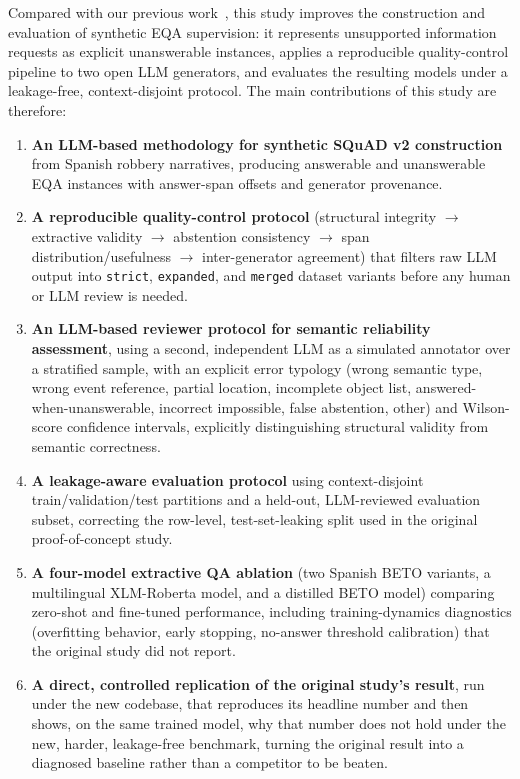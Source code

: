 \documentclass[graybox]{SNmult}
\begin{document}
Compared with our previous work~\cite{falconi2026robberyqa}, this study
improves the construction and evaluation of synthetic EQA supervision: it
represents unsupported information requests as explicit unanswerable
instances, applies a reproducible quality-control pipeline to two open LLM
generators, and evaluates the resulting models under a leakage-free,
context-disjoint protocol. The main contributions of this study are therefore:
\begin{enumerate}
\item \textbf{An LLM-based methodology for synthetic SQuAD v2
    construction} from Spanish robbery narratives, producing
  answerable and unanswerable EQA instances with answer-span offsets
  and generator provenance.
\item \textbf{A reproducible quality-control protocol} (structural
  integrity $\rightarrow$ extractive validity $\rightarrow$ abstention
  consistency $\rightarrow$ span distribution/usefulness $\rightarrow$
  inter-generator agreement) that filters raw LLM output into
  \texttt{strict}, \texttt{expanded}, and \texttt{merged} dataset
  variants before any human or LLM review is needed.
\item \textbf{An LLM-based reviewer protocol for semantic reliability
    assessment}, using a second, independent LLM as a simulated
  annotator over a stratified sample, with an explicit error typology
  (wrong semantic type, wrong event reference, partial location,
  incomplete object list, answered-when-unanswerable, incorrect
  impossible, false abstention, other) and Wilson-score confidence
  intervals, explicitly distinguishing structural validity from
  semantic correctness.
\item \textbf{A leakage-aware evaluation protocol} using
  context-disjoint train/validation/test partitions and a held-out,
  LLM-reviewed evaluation subset, correcting the row-level,
  test-set-leaking split used in the original proof-of-concept study.
\item \textbf{A four-model extractive QA ablation} (two Spanish BETO
  variants, a multilingual XLM-Roberta model, and a distilled BETO
  model) comparing zero-shot and fine-tuned performance, including
  training-dynamics diagnostics (overfitting behavior, early stopping,
  no-answer threshold calibration) that the original study did not
  report.
\item \textbf{A direct, controlled replication of the original study's
    result}, run under the new codebase, that reproduces its headline
  number and then shows, on the same trained model, why that number
  does not hold under the new, harder, leakage-free
  benchmark, turning the original result into a diagnosed baseline
  rather than a competitor to be beaten.
\end{enumerate}
\end{document}
